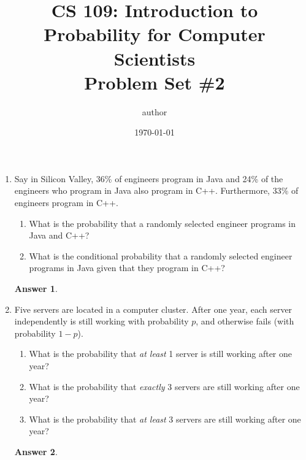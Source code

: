\documentclass[12pt]{article}
\title{CS 109: Introduction to Probability for Computer Scientists\\Problem Set \#2}
\author{author} %
\date{\today} %
\renewcommand{\(}{\left(}
\renewcommand{\)}{\right)}
\theoremstyle{definition}
\newtheorem*{answer}{Answer}
\begin{document}
\maketitle
  
\begin{enumerate}
    \item Say in Silicon Valley, 36\% of engineers program in Java and 24\% of the engineers who program in Java also program in C++. Furthermore, 33\% of engineers program in C++.
    \begin{enumerate}
        \item What is the probability that a randomly selected engineer programs in Java and C++?
        \item What is the conditional probability that a randomly selected engineer programs in Java given that they program in C++?
    \end{enumerate}
    
    \begin{shaded}
    \begin{answer}
    
    \end{answer}
    \end{shaded}
    \pagebreak
    \item Five servers are located in a computer cluster. After one year, each server independently is still working with probability $p$, and otherwise fails (with probability $1-p$).
    \begin{enumerate}
        \item What is the probability that \textit{at least} 1 server is still working after one year?
        \item What is the probability that \textit{exactly} 3 servers are still working after one year?
        \item What is the probability that \textit{at least} 3 servers are still working after one year?
    \end{enumerate}
    
    \begin{shaded}
    \begin{answer}
    

\end{answer}
\end{shaded}
\end{enumerate}
\end{document}
